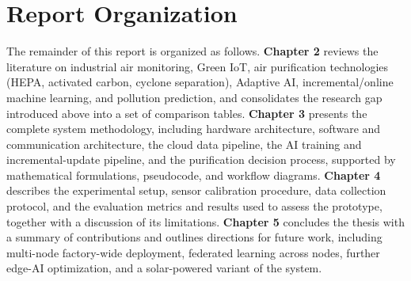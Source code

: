 \section{Report Organization}
\label{sec:report-organization}

The remainder of this report is organized as follows. \textbf{Chapter 2} reviews the literature on industrial air monitoring, Green IoT, air purification technologies (HEPA, activated carbon, cyclone separation), Adaptive AI, incremental/online machine learning, and pollution prediction, and consolidates the research gap introduced above into a set of comparison tables. \textbf{Chapter 3} presents the complete system methodology, including hardware architecture, software and communication architecture, the cloud data pipeline, the AI training and incremental-update pipeline, and the purification decision process, supported by mathematical formulations, pseudocode, and workflow diagrams. \textbf{Chapter 4} describes the experimental setup, sensor calibration procedure, data collection protocol, and the evaluation metrics and results used to assess the prototype, together with a discussion of its limitations. \textbf{Chapter 5} concludes the thesis with a summary of contributions and outlines directions for future work, including multi-node factory-wide deployment, federated learning across nodes, further edge-AI optimization, and a solar-powered variant of the system.
